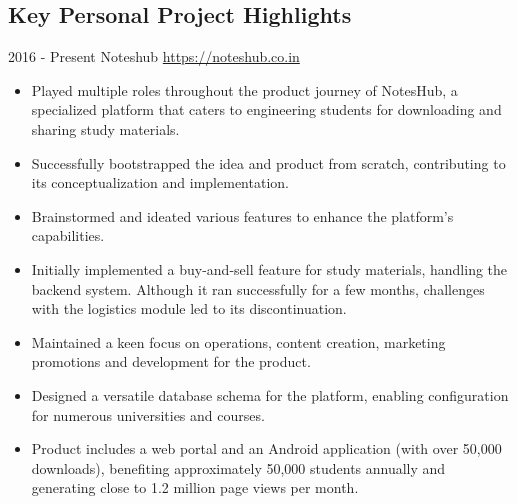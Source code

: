 \documentclass[letterpaper]{twentysecondcv} %
\begin{document}
\begin{fullwidth}
\section{Key Personal Project Highlights}
\begin{twenty}
    \twentyitem
    	{2016 - }
            {Present}
        {Noteshub}
        {\href{https://noteshub.co.in/}{https://noteshub.co.in}}
        {}
        {
        {\begin{itemize}
        \item Played multiple roles throughout the product journey of NotesHub, a specialized platform that caters to engineering students for downloading and sharing study materials.
        \item Successfully bootstrapped the idea and product from scratch, contributing to its conceptualization and implementation.
        \item Brainstormed and ideated various features to enhance the platform's capabilities.
        \item Initially implemented a buy-and-sell feature for study materials, handling the backend system. Although it ran successfully for a few months, challenges with the logistics module led to its discontinuation.
        \item Maintained a keen focus on operations, content creation, marketing promotions and development for the product.
        \item Designed a versatile database schema for the platform, enabling configuration for numerous universities and courses.
        \item Product includes a web portal and an Android application (with over 50,000 downloads), benefiting approximately 50,000 students annually and generating close to 1.2 million page views per month.
        \end{itemize}}
        }
    \\
\end{twenty}
\end{fullwidth}
\end{document}
